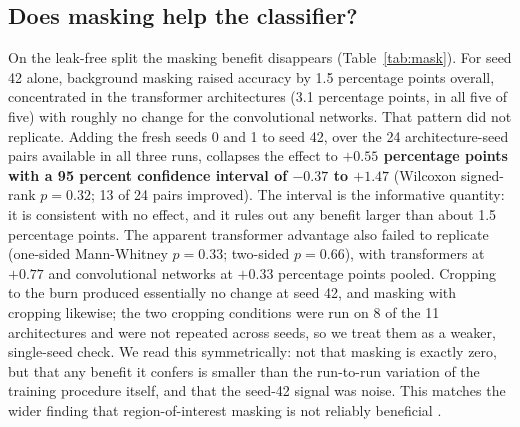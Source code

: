 \documentclass{melba}
\begin{document}
\subsection{Does masking help the classifier?}
\label{Res:mask}
On the leak-free split the masking benefit disappears (Table~\ref{tab:mask}). For seed 42 alone, background masking raised accuracy by 1.5 percentage points overall, concentrated in the transformer architectures (3.1 percentage points, in all five of five) with roughly no change for the convolutional networks. That pattern did not replicate. Adding the fresh seeds 0 and 1 to seed 42, over the 24 architecture-seed pairs available in all three runs, collapses the effect to \textbf{$+0.55$ percentage points with a 95 percent confidence interval of $-0.37$ to $+1.47$} (Wilcoxon signed-rank $p=0.32$; 13 of 24 pairs improved). The interval is the informative quantity: it is consistent with no effect, and it rules out any benefit larger than about 1.5 percentage points. The apparent transformer advantage also failed to replicate (one-sided Mann-Whitney $p=0.33$; two-sided $p=0.66$), with transformers at $+0.77$ and convolutional networks at $+0.33$ percentage points pooled. Cropping to the burn produced essentially no change at seed 42, and masking with cropping likewise; the two cropping conditions were run on 8 of the 11 architectures and were not repeated across seeds, so we treat them as a weaker, single-seed check. We read this symmetrically: not that masking is exactly zero, but that any benefit it confers is smaller than the run-to-run variation of the training procedure itself, and that the seed-42 signal was noise. This matches the wider finding that region-of-interest masking is not reliably beneficial \citep{sourget}.
\end{document}
